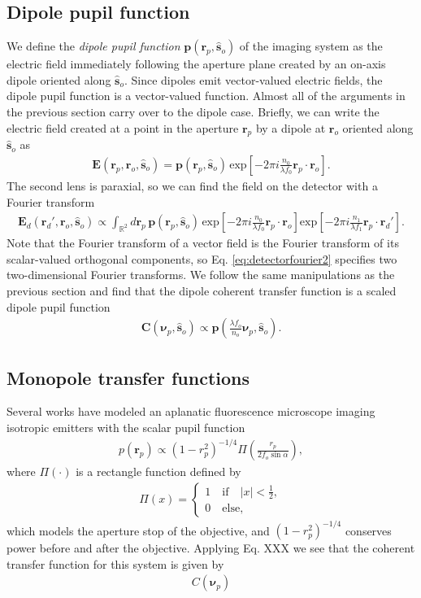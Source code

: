 \documentclass[]{osa-article}
\providecommand{\mb}[1]{\mathbf{#1}}
\providecommand{\ro}{\mathbf{\mathbf{r}}_o}
\providecommand{\so}{\mathbf{\hat{s}}_o}
\providecommand{\rp}{\mathbf{r}_p}
\providecommand{\rd}{\mathbf{r}_d}
\providecommand{\mbb}[1]{\mathbb{#1}}
\providecommand{\bs}[1]{\boldsymbol{#1}}
\providecommand{\bvp}{\bs{\nu}_p}
\begin{document}
\subsection{Dipole pupil function} 
We define the \textit{dipole pupil function} $\mb{p}(\rp, \so)$ of the imaging
system as the electric field immediately following the aperture plane created by
an on-axis dipole oriented along $\so$. Since dipoles emit vector-valued
electric fields, the dipole pupil function is a vector-valued function. Almost
all of the arguments in the previous section carry over to the dipole case.
Briefly, we can write the electric field created at a point in the aperture
$\rp$ by a dipole at $\ro$ oriented along $\so$ as
 \begin{align}
   \mb{E}(\rp, \ro, \so) = \mb{p}(\rp, \so)\,\text{exp}\left[-2\pi i \frac{n_0}{\lambda f_0} \rp\cdot\ro \right]. \label{eq:pupil2}
 \end{align}
 The second lens is paraxial, so we can find the field on the detector with a
 Fourier transform
 \begin{align}
   \mb{E}_d(\rd', \ro, \so) \propto \int_{\mbb{R}^2}d\rp\, \mb{p}(\rp, \so)\,\text{exp}\left[-2\pi i \frac{n_0}{\lambda f_0} \rp\cdot\ro \right]\text{exp}\left[-2\pi i \frac{n_1}{\lambda f_1} \rp\cdot\rd' \right]. \label{eq:detectorfourier2}
\end{align}
Note that the Fourier transform of a vector field is the Fourier transform of
its scalar-valued orthogonal components, so Eq. \ref{eq:detectorfourier2}
specifies two two-dimensional Fourier transforms. We follow the same
manipulations as the previous section and find that the dipole coherent transfer
function is a scaled dipole pupil function
\begin{align}
  \mb{C}(\bvp, \so) \propto \mb{p}\left(\frac{\lambda f_o}{n_o}\bvp, \so\right). \label{eq:monopupil}
\end{align}

\subsection{Monopole transfer functions}
Several works \cite{petrov2017, backlund2018} have modeled an aplanatic
fluorescence microscope imaging isotropic emitters with the scalar pupil
function
\begin{align}
  p(\rp) \propto (1 - r_p^2)^{-1/4}\Pi\left(\frac{r_p}{2f_o\sin\alpha}\right), 
\end{align}
where $\Pi(\cdot)$ is a rectangle function defined by
\begin{align}
  \Pi(x) = 
  \begin{cases}
    1\quad \text{if}\quad |x| < \frac{1}{2},\\
    0\quad \text{else},
  \end{cases}
\end{align}
which models the aperture stop of the objective, and $(1 - r_p^2)^{-1/4}$
conserves power before and after the objective. Applying Eq. XXX we see that the
coherent transfer function for this system is given by
\begin{align}
  C(\bvp)
\end{align}
\end{document}
